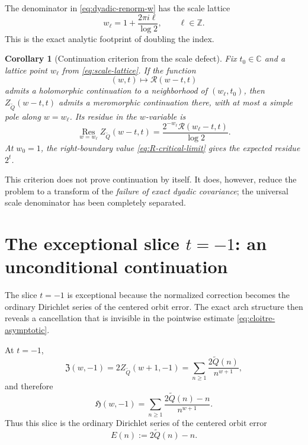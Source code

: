 \documentclass[11pt]{article}
\newtheorem{corollary}[theorem]{Corollary}
\theoremstyle{definition}
\theoremstyle{remark}
\newcommand{\Qp}{\widetilde Q}
\newcommand{\C}{\mathbb C}
\newcommand{\Hz}{\mathfrak H}
\newcommand{\Zn}{\mathfrak Z}
\begin{document}
The denominator in \eqref{eq:dyadic-renorm-w} has the scale lattice
\begin{equation}
w_\ell=1+\frac{2\pi i\ell}{\log2},
\qquad \ell\in\mathbb Z.
\label{eq:scale-lattice}
\end{equation}
This is the exact analytic footprint of doubling the index.

\begin{corollary}[Continuation criterion from the scale defect]
\label{cor:scale-continuation}
Fix \(t_0\in\C\) and a lattice point \(w_\ell\) from \eqref{eq:scale-lattice}.  If the function
\[
(w,t)\longmapsto\mathscr R(w-t,t)
\]
admits a holomorphic continuation to a neighborhood of \((w_\ell,t_0)\), then
\(Z_{\Qp}(w-t,t)\) admits a meromorphic continuation there, with at most a simple pole along \(w=w_\ell\).  Its residue in the \(w\)-variable is
\begin{equation}
\operatorname*{Res}_{w=w_\ell}Z_{\Qp}(w-t,t)
=\frac{2^{-w_\ell}\mathscr R(w_\ell-t,t)}{\log2}.
\label{eq:scale-residue}
\end{equation}
At \(w_0=1\), the right-boundary value \eqref{eq:R-critical-limit} gives the expected residue \(2^t\).
\end{corollary}

This criterion does not prove continuation by itself.  It does, however, reduce the problem to a transform of the \emph{failure of exact dyadic covariance}; the universal scale denominator has been completely separated.

\section{The exceptional slice \texorpdfstring{$t=-1$}{t=-1}: an unconditional continuation}

The slice \(t=-1\) is exceptional because the normalized correction becomes the ordinary Dirichlet series of the centered orbit error.  The exact arch structure then reveals a cancellation that is invisible in the pointwise estimate \eqref{eq:cloitre-asymptotic}.

At \(t=-1\),
\begin{equation}
\Zn(w,-1)
=2Z_{\Qp}(w+1,-1)
=\sum_{n\ge1}\frac{2\Qp(n)}{n^{w+1}},
\label{eq:tminus1-Z}
\end{equation}
and therefore
\begin{equation}
{
\Hz(w,-1)
=\sum_{n\ge1}\frac{2\Qp(n)-n}{n^{w+1}}.
}
\label{eq:tminus1-H}
\end{equation}
Thus this slice is the ordinary Dirichlet series of the centered orbit error
\begin{equation}
E(n):=2\Qp(n)-n.
\label{eq:centered-E}
\end{equation}
\end{document}
